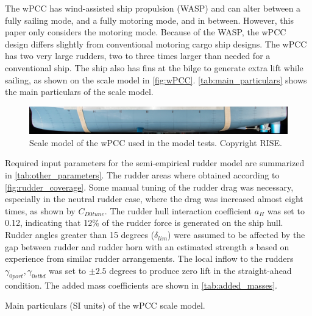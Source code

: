 The wPCC has wind-assisted ship propulsion (WASP) and can alter between a fully sailing mode, and a fully motoring mode, and in between. 
However, this paper only considers the motoring mode. Because of the WASP, the wPCC design differs slightly from conventional motoring cargo ship designs. The wPCC has two very large rudders, two to three times larger than needed for a conventional ship. The ship also has fins at the bilge to generate extra lift while sailing, as shown on the scale model in \autoref{fig:wPCC}. 
\autoref{tab:main_particulars} shows the main particulars of the scale model. 
\begin{figure}[h]
    \centering
    \includegraphics[width=\columnwidth]{figures/5m2.jpg}
    \caption{Scale model of the wPCC used in the model tests. Copyright RISE.}
    \label{fig:wPCC}
\end{figure}

Required input parameters for the semi-empirical rudder model are summarized in \autoref{tab:other_parameters}.
The rudder areas where obtained according to \autoref{fig:rudder_coverage}.   
Some manual tuning of the rudder drag was necessary, especially in the neutral rudder case, where the drag was increased almost eight times, as shown by $C_{D0tune}$. The rudder hull interaction coefficient $a_H$ was set to 0.12, indicating that 12\% of the rudder force is generated on the ship hull.
Rudder angles greater than 15 degrees ($\delta_{lim}$) were assumed to be affected by the gap between rudder and rudder horn with an estimated strength $s$ based on experience from similar rudder arrangements.
The local inflow to the rudders $\gamma_{0port},\gamma_{0stbd}$ was set to $\pm 2.5$ degrees to produce zero lift in the straight-ahead condition.
The added mass coefficients are shown in \autoref{tab:added_masses}.
\begin{table}[h]
    \centering
    \caption{Main particulars (SI units) of the wPCC scale model.}
    \label{tab:main_particulars}
\end{table}